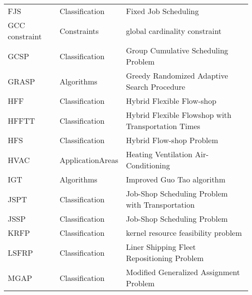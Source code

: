 {\begin{longtable}{llp{12cm}}
\index{FJS (Fixed Job Scheduling)}\index{Fixed Job Scheduling (FJS)}FJS & Classification & Fixed Job Scheduling\\
\index{GCC constraint (global cardinality constraint)}\index{global cardinality constraint (GCC constraint)}GCC constraint & Constraints & global cardinality constraint\\
\index{GCSP (Group Cumulative Scheduling Problem)}\index{Group Cumulative Scheduling Problem (GCSP)}GCSP & Classification & Group Cumulative Scheduling Problem\\
\index{GRASP (Greedy Randomized Adaptive Search Procedure)}\index{Greedy Randomized Adaptive Search Procedure (GRASP)}GRASP & Algorithms & Greedy Randomized Adaptive Search Procedure\\
\index{HFF (Hybrid Flexible Flow-shop)}\index{Hybrid Flexible Flow-shop (HFF)}HFF & Classification & Hybrid Flexible Flow-shop\\
\index{HFFTT (Hybrid Flexible Flowshop with Transportation Times)}\index{Hybrid Flexible Flowshop with Transportation Times (HFFTT)}HFFTT & Classification & Hybrid Flexible Flowshop with Transportation Times\\
\index{HFS (Hybrid Flow-shop Problem)}\index{Hybrid Flow-shop Problem (HFS)}HFS & Classification & Hybrid Flow-shop Problem\\
\index{HVAC (Heating Ventilation Air-Conditioning)}\index{Heating Ventilation Air-Conditioning (HVAC)}HVAC & ApplicationAreas & Heating Ventilation Air-Conditioning\\
\index{IGT (Improved Guo Tao algorithm)}\index{Improved Guo Tao algorithm (IGT)}IGT & Algorithms & Improved Guo Tao algorithm\\
\index{JSPT (Job-Shop Scheduling Problem with Transportation)}\index{Job-Shop Scheduling Problem with Transportation (JSPT)}JSPT & Classification & Job-Shop Scheduling Problem with Transportation\\
\index{JSSP (Job-Shop Scheduling Problem)}\index{Job-Shop Scheduling Problem (JSSP)}JSSP & Classification & Job-Shop Scheduling Problem\\
\index{KRFP (kernel resource feasibility problem)}\index{kernel resource feasibility problem (KRFP)}KRFP & Classification & kernel resource feasibility problem\\
\index{LSFRP (Liner Shipping Fleet Repositioning Problem)}\index{Liner Shipping Fleet Repositioning Problem (LSFRP)}LSFRP & Classification & Liner Shipping Fleet Repositioning Problem\\
\index{MGAP (Modified Generalized Assignment Problem)}\index{Modified Generalized Assignment Problem (MGAP)}MGAP & Classification & Modified Generalized Assignment Problem\\

\end{longtable}}
